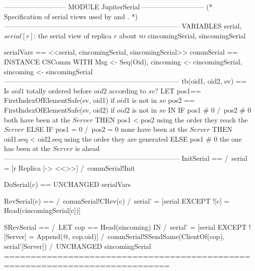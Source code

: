 \documentclass{article}
\begin{document}
\begin{tla}
--------------------------- MODULE JupiterSerial ---------------------------
(*
Specification of serial views used by \absjupiter{} and \cjupiter{}.
*)
-----------------------------------------------------------------------------
VARIABLES 
    serial, \* $serial[r]$: the serial view of replica $r$ about \textsc{so} 
    cincomingSerial, sincomingSerial

serialVars == <<serial, cincomingSerial, sincomingSerial>>
commSerial == INSTANCE CSComm WITH Msg <- Seq(Oid), 
                cincoming <- cincomingSerial, sincoming <- sincomingSerial
-----------------------------------------------------------------------------
tb(oid1, oid2, sv) == \* Is $oid1$ totally ordered before $oid2$ according to $sv$?
    LET  pos1== FirstIndexOfElementSafe(sv, oid1)  if $oid1$ is not in $sv$
        pos2 == FirstIndexOfElementSafe(sv, oid2)  if $oid2$ is not in $sv$
    IN  IF pos1 # 0 /\ pos2 # 0 \* both have been at the $Server$
        THEN pos1 < pos2        \* using the order they reach the $Server$
        ELSE IF pos1 = 0 /\ pos2 = 0  \* none have been at the $Server$
             THEN oid1.seq < oid2.seq \* using the order they are generated
             ELSE pos1 # 0 \* the one has been at the $Server$ is ahead
-----------------------------------------------------------------------------
InitSerial ==
    /\ serial = [r \in Replica |-> <<>>]
    /\ commSerial!Init

DoSerial(c) ==
    UNCHANGED serialVars

RevSerial(c) ==
    /\ commSerial!CRev(c)
    /\ serial' = [serial EXCEPT ![c] = Head(cincomingSerial[c])]

SRevSerial ==
    /\ LET cop == Head(sincoming)
       IN  /\ serial' = [serial EXCEPT ![Server] = Append(@, cop.oid)]
           /\ commSerial!SSendSame(ClientOf(cop), serial'[Server])
    /\ UNCHANGED sincomingSerial
=============================================================================
\end{tla}
\end{document}
